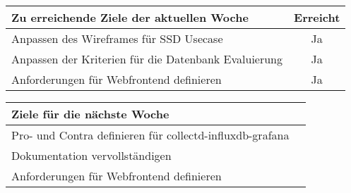 \begin{tabularx}{\textwidth}{Xc}
    \arrayrulecolor{OliveGreen}
    \toprule
    {\bfseries Zu erreichende Ziele der aktuellen Woche} & {\bfseries Erreicht} \\
    \midrule[2pt]
    Anpassen des Wireframes für SSD Usecase              &Ja                    \\
    \rowcolor{OliveGreen!15}
    Anpassen der Kriterien für die Datenbank Evaluierung &Ja                    \\
    \rowcolor{OliveGreen!15}
    Anforderungen für Webfrontend definieren             &Ja                    \\
   \bottomrule[2pt]
\end{tabularx}
%
\vspace{1cm}
%
\begin{tabularx}{\textwidth}{Xc}
    \arrayrulecolor{OliveGreen}
    \toprule
    {\bfseries Ziele für die nächste Woche}              &                      \\
    \midrule[2pt]
    Pro- und Contra definieren für collectd-influxdb-grafana  &                 \\
    \rowcolor{OliveGreen!15}
    Dokumentation vervollständigen                            &                 \\
    \rowcolor{OliveGreen!15}
    Anforderungen für Webfrontend definieren                  &                 \\
\end{tabularx}
